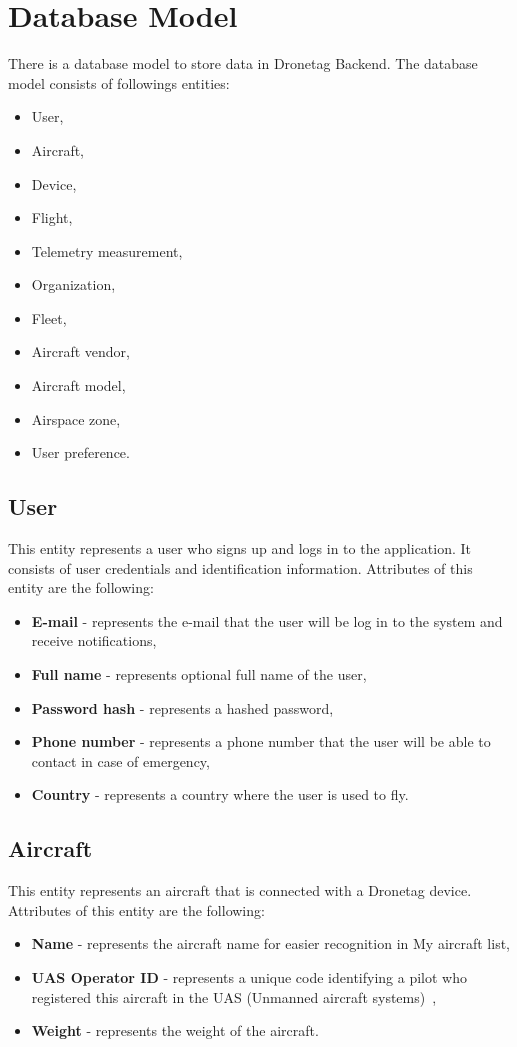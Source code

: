 \section{Database Model}\label{sec:database-model}
There is a database model to store data in Dronetag Backend.
The database model consists of followings entities:
\begin{itemize}
    \item User,
    \item Aircraft,
    \item Device,
    \item Flight,
    \item Telemetry measurement,
    \item Organization,
    \item Fleet,
    \item Aircraft vendor,
    \item Aircraft model,
    \item Airspace zone,
    \item User preference.
\end{itemize}

\subsection{User}\label{subsec:user}
This entity represents a user who signs up and logs in to the application.
It consists of user credentials and identification information.
Attributes of this entity are the following:
\begin{itemize}
    \item \textbf{E-mail} - represents the e-mail that the user will be log in to the system and receive notifications,
    \item \textbf{Full name} - represents optional full name of the user,
    \item \textbf{Password hash} - represents a hashed password,
    \item \textbf{Phone number} - represents a phone number that the user will be able to contact in case of emergency,
    \item \textbf{Country} - represents a country where the user is used to fly.
\end{itemize}

\subsection{Aircraft}\label{subsec:aircraft}
This entity represents an aircraft that is connected with a Dronetag device.
Attributes of this entity are the following:
\begin{itemize}
    \item \textbf{Name} - represents the aircraft name for easier recognition in My aircraft list,
    \item \textbf{UAS Operator ID} - represents a unique code identifying a pilot who registered this aircraft in the UAS (Unmanned aircraft systems)~\cite{uas},
    \item \textbf{Weight} - represents the weight of the aircraft.
\end{itemize}

